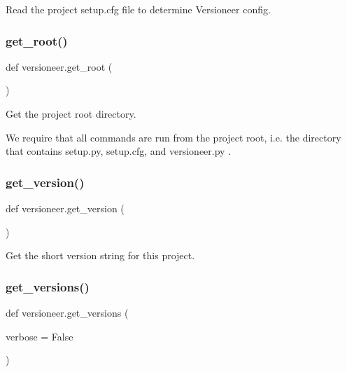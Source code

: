 \begin{DoxyVerb}Read the project setup.cfg file to determine Versioneer config.\end{DoxyVerb}
 \mbox{\label{namespaceversioneer_a32e3afb612d9def7b20a3529c118eaac}} 
\subsubsection{\texorpdfstring{get\+\_\+root()}{get\_root()}}
{\footnotesize\ttfamily def versioneer.\+get\+\_\+root (\begin{DoxyParamCaption}{ }\end{DoxyParamCaption})}

\begin{DoxyVerb}Get the project root directory.

We require that all commands are run from the project root, i.e. the
directory that contains setup.py, setup.cfg, and versioneer.py .
\end{DoxyVerb}
 \mbox{\label{namespaceversioneer_a04a68e97508b9bd277097bf2644545bd}} 
\subsubsection{\texorpdfstring{get\+\_\+version()}{get\_version()}}
{\footnotesize\ttfamily def versioneer.\+get\+\_\+version (\begin{DoxyParamCaption}{ }\end{DoxyParamCaption})}

\begin{DoxyVerb}Get the short version string for this project.\end{DoxyVerb}
 \mbox{\label{namespaceversioneer_a8b2824586f2d033c523adca6c108394c}} 
\subsubsection{\texorpdfstring{get\+\_\+versions()}{get\_versions()}}
{\footnotesize\ttfamily def versioneer.\+get\+\_\+versions (\begin{DoxyParamCaption}\item[{}]{verbose = {\ttfamily False} }\end{DoxyParamCaption})}

